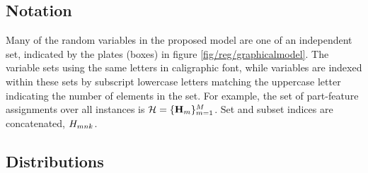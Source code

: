 \subsection{Notation}
Many of the random variables in the proposed model are one of an independent set, indicated by the plates (boxes) in figure \ref{fig/reg/graphicalmodel}. The variable sets using the same letters in caligraphic font, while variables are indexed within these sets by subscript lowercase letters matching the uppercase letter indicating the number of elements in the set. For example, the set of part-feature assignments over all instances is $\mathcal{H} = \{\mathbf{H}_{m}\}_{m=1}^M$. Set and subset indices are concatenated, \eg ${H}_{mnk}$.

\subsection{Distributions}

